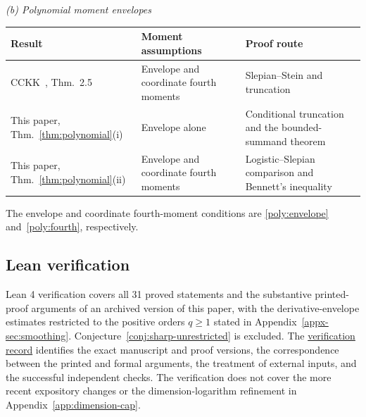 \documentclass[11pt,letterpaper]{article}
\theoremstyle{remark}
\begin{document}
\begin{table}[!htb]
\medskip
\textit{(b) Polynomial moment envelopes}\par\smallskip
\begin{tabularx}{\textwidth}{@{}>{\raggedright\arraybackslash}p{}
 >{\raggedright\arraybackslash}p{}
 >{\raggedright\arraybackslash}X@{}}
\toprule
Result & Moment assumptions & Proof route \\
\midrule
CCKK~\cite{CCKK2022}, Thm.~2.5 & Envelope and coordinate fourth moments & Slepian--Stein and truncation \\[2pt]
This paper, Thm.~\ref{thm:polynomial}(i) & Envelope alone & Conditional truncation and the bounded-summand theorem \\[2pt]
This paper, Thm.~\ref{thm:polynomial}(ii) & Envelope and coordinate fourth moments & Logistic--Slepian comparison and Bennett's inequality \\
\bottomrule
\end{tabularx}
\smallskip
{\footnotesize\raggedright
The envelope and coordinate fourth-moment conditions are
\eqref{poly:envelope} and~\eqref{poly:fourth}, respectively.\par}
\end{table}

\subsection{Lean verification}\label{sec:lean-introduction}
{Lean 4 verification covers all 31 proved statements and the substantive
printed-proof arguments of an archived version of this paper, with the
derivative-envelope estimates restricted to the positive orders
\(q\ge1\) stated in Appendix~\ref{appx-sec:smoothing}.
Conjecture~\ref{conj:sharp-unrestricted} is excluded. The
\href{https://github.com/VC2015/HDCLTs/blob/0ef13b938895535fe2dcc135b9400688ed97fa61/lean-rectangle-clt-singular/split-v4-certification/printed-proof-extension/README.md}{verification record}
identifies the exact manuscript and proof versions, the correspondence
between the printed and formal arguments, the treatment of external
inputs, and the successful independent checks. The verification does not
cover the more recent expository changes or the dimension-logarithm
refinement in Appendix~\ref{app:dimension-cap}.}
\end{document}
